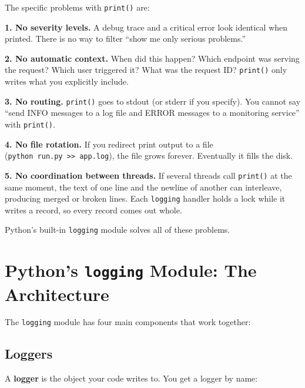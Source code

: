 \noindent{}The specific problems with \texttt{print()} are:

\textbf{1. No severity levels.} A debug trace and a critical error look identical when printed. There is no way to filter ``show me only serious problems.''

\textbf{2. No automatic context.} When did this happen? Which endpoint was serving the request? Which user triggered it? What was the request ID? \texttt{print()} only writes what you explicitly include.

\textbf{3. No routing.} \texttt{print()} goes to stdout (or stderr if you specify). You cannot say ``send INFO messages to a log file and ERROR messages to a monitoring service'' with \texttt{print()}.

\textbf{4. No file rotation.} If you redirect print output to a file (\texttt{python\ run.}\allowbreak{}\texttt{py\ \textgreater{}\textgreater{}\ app.}\allowbreak{}\texttt{log}), the file grows forever. Eventually it fills the disk.

\textbf{5. No coordination between threads.} If several threads call \texttt{print()} at the same moment, the text of one line and the newline of another can interleave, producing merged or broken lines. Each \texttt{logging} handler holds a lock while it writes a record, so every record comes out whole.

Python's built-in \texttt{logging} module solves all of these problems.

\setcounter{section}{1}
\section{\texorpdfstring{Python's \texttt{logging} Module: The Architecture}{Python's logging Module: The Architecture}}\label{16-logging-error-handling:162-pythons-logging-module-the-architecture}

The \texttt{logging} module has four main components that work together:

\subsection*{Loggers}\label{16-logging-error-handling:loggers}

A \textbf{logger} is the object your code writes to. You get a logger by name:

\begin{codebox}[short]

\begin{Shaded}
\begin{Highlighting}[]
\OperatorTok{=}\NormalTok{)}
\end{Highlighting}
\end{Shaded}

\end{codebox}


